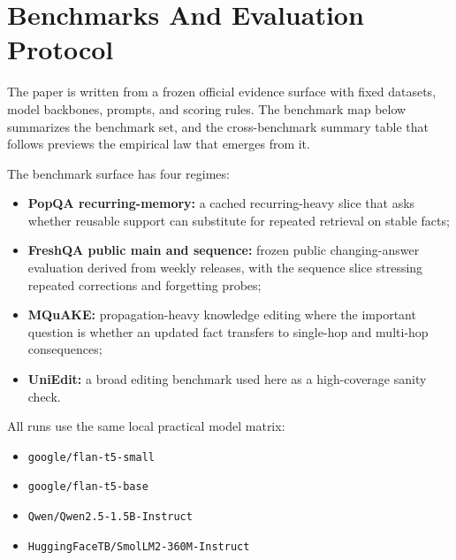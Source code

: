 \section{Benchmarks And Evaluation Protocol}

The paper is written from a frozen official evidence surface with fixed datasets, model backbones, prompts, and scoring rules. The benchmark map below summarizes the benchmark set, and the cross-benchmark summary table that follows previews the empirical law that emerges from it.

\begin{table}[h]
\centering
\scriptsize

\caption{Benchmark map for the official benchmark surface. The headline evidence comes from frozen runs on PopQA, FreshQA public main and sequence, MQuAKE, and UniEdit.}
\label{tab:benchmark-map}
\end{table}

\begin{table}[h]
\centering
\scriptsize

\caption{Cross-benchmark summary from the frozen evidence surface. The key result is not broad router superiority; it is a boundary law showing where delayed utility helps and where retrieval should dominate.}
\label{tab:cross-benchmark-summary}
\end{table}

The benchmark surface has four regimes:
\begin{itemize}[leftmargin=1.5em]
\item \textbf{PopQA recurring-memory:} a cached recurring-heavy slice that asks whether reusable support can substitute for repeated retrieval on stable facts;
\item \textbf{FreshQA public main and sequence:} frozen public changing-answer evaluation derived from weekly releases, with the sequence slice stressing repeated corrections and forgetting probes;
\item \textbf{MQuAKE:} propagation-heavy knowledge editing where the important question is whether an updated fact transfers to single-hop and multi-hop consequences;
\item \textbf{UniEdit:} a broad editing benchmark used here as a high-coverage sanity check.
\end{itemize}

All runs use the same local practical model matrix:
\begin{itemize}[leftmargin=1.5em]
\item \texttt{google/flan-t5-small}
\item \texttt{google/flan-t5-base}
\item \texttt{Qwen/Qwen2.5-1.5B-Instruct}
\item \texttt{HuggingFaceTB/SmolLM2-360M-Instruct}
\end{itemize}

